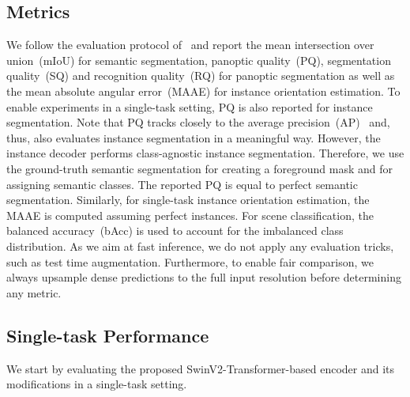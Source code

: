 \documentclass[conference]{IEEEtran}
\begin{document}
\subsection{Metrics}
\label{sec:experiments:metrics}
We follow the evaluation protocol of~\cite{emsanet2022ijcnn} and report the mean intersection over union~(mIoU) for semantic segmentation, panoptic quality~(PQ), segmentation quality~(SQ) and recognition quality~(RQ) for panoptic segmentation as well as the mean absolute angular error~(MAAE) for instance orientation estimation.
To enable experiments in a single-task setting, PQ is also reported for instance segmentation.
Note that PQ tracks closely to the average precision~(AP)~\cite{Panopticsegmentation-cvpr2019} and, thus, also evaluates instance segmentation in a meaningful way.
However, the instance decoder performs class-agnostic instance segmentation.
Therefore, we use the ground-truth semantic segmentation for creating a foreground mask and for assigning semantic classes.
The reported PQ is equal to perfect semantic segmentation.
Similarly, for single-task instance orientation estimation, the MAAE is computed assuming perfect instances.
For scene classification, the balanced accuracy~(bAcc) is used to account for the imbalanced class distribution.
As we aim at fast inference, we do not apply any evaluation tricks, such as test time augmentation.
Furthermore, to enable fair comparison, we always upsample dense predictions to the full input resolution before determining any metric.
\subsection{Single-task Performance}
\label{sec:experiments:single}
We start by evaluating the proposed SwinV2-Transformer-based encoder and its modifications in a single-task setting.
\end{document}
